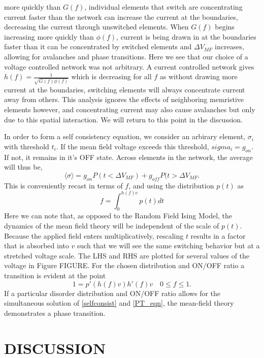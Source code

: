 \documentclass[aps,prl,preprint,groupedaddress]{revtex4-1}
\begin{document}
more quickly than $G(f)$, individual elements that switch are concentrating
current faster
than the network can increase the current at the boundaries, decreasing the
current through unswitched elements.  When $G(f)$ begins increasing more
quickly than $\phi(f)$, current is being drawn in at the boundaries faster
than it can be concentrated by switched elements and $\Delta V_{MF}$ increases,
allowing for avalanches and phase transitions. Here we see that our choice of
a voltage controlled network was not arbitrary.  A current controlled network
gives $h(f) = \frac{1}{\sqrt{G(f)\phi(f)}}$ which is decreasing for all $f$
as without
drawing more current at the boundaries, switching elements will always
concentrate current away from others. This analysis ignores the effects of
neighboring memristive elements however, and concentrating current may also
cause avalanches but only due to this spatial interaction.  We will return
to this point in the discussion.

In order to form a self consistency equation, we consider an arbirary element,
$\sigma_i$ with threshold $t_i$.  If the mean field voltage exceeds this
threshold, $sigma_i = g_{on}$. If not, it remains in it's OFF state. Across
elements in the network, the average will thus be,
\[\langle \sigma \rangle = g_{on} P(t < \Delta V_{MF}) + 
g_{off} P(t> \Delta V_{MF}.\]
This is conveniently recast in terms of $f$, and using the distribution
$p(t)$ as
\begin{equation}\label{selfconsist}
f = \int_0^{h(f) v} p(t) dt
\end{equation}
Here we can note that, as opposed to the Random Field Ising Model, the
dynamics of the
mean field theory will be independent of the scale of $p(t)$.  Because the
applied field enters multiplicatively, rescaling $t$ results in a factor that
is absorbed into $v$ such that we will see the same switching behavior but
at a stretched voltage scale. The LHS and
RHS are plotted for several values of the voltage in Figure FIGURE.  For
the chosen distribution and ON/OFF ratio a transition is evident at the
point
\begin{equation}\label{PT_eqn}
1 = p'(h(f)v)h'(f)v \quad 0\le f\le 1.
\end{equation}
If a particular disorder distribution and ON/OFF ratio allows for the
simultaneous solution of \ref{selfconsist} and \ref{PT_eqn}, the mean-field
theory demonstrates a phase transition.

\section{DISCUSSION}
\end{document}
